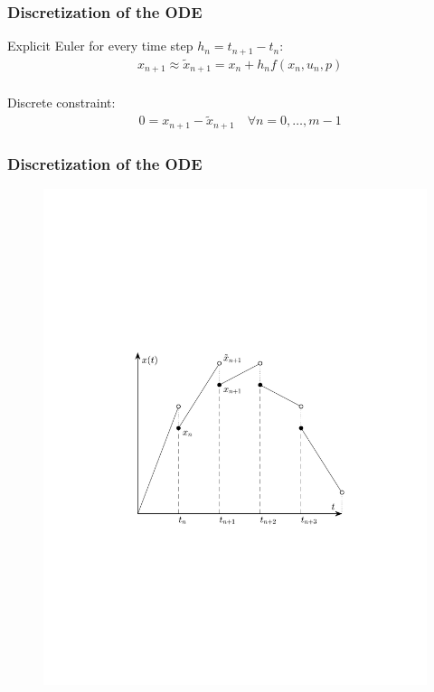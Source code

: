 \begin{frame}
	
	\frametitle{Discretization of the ODE}
	
	Explicit Euler for every time step $h_n=t_{n+1}-t_n$:
	\begin{align*}
	  &x_{n+1} \approx \tilde{x}_{n+1} = x_n + h_n f(x_n,u_n,p) \\
	\end{align*}
	
	Discrete constraint:
	\begin{align*}
	  &0 = x_{n+1} - \tilde{x}_{n+1} \quad \forall n = 0,\ldots,m-1
	\end{align*}

	
\end{frame}

\begin{frame}
	\frametitle{Discretization of the ODE}
	
	\begin{figure}[bth]
	  \begin{center}
	    \includegraphics[trim=1cm 5cm 0cm 8cm, clip=true, 
	    width=\linewidth]{img/multShootPlot}
	  \end{center}
	\end{figure}
\end{frame}


